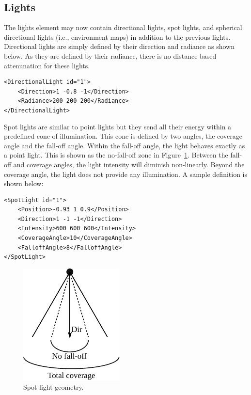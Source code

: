 \documentclass[12pt]{article}
\begin{document}
\subsection{Lights}

The lights element may now contain directional lights, spot lights,
and spherical directional lights (i.e., environment maps) in
addition to the previous lights. Directional lights are simply defined
by their direction and radiance as shown below. As they are defined by
their radiance, there is no distance based attenunation for these
lights.

\begin{verbatim}
<DirectionalLight id="1">
    <Direction>1 -0.8 -1</Direction>
    <Radiance>200 200 200</Radiance>
</DirectionalLight>
\end{verbatim}

Spot lights are similar to point lights but they send all their energy
within a predefined cone of illumination. This cone is defined by two
angles, the coverage angle and the fall-off angle. Within the fall-off
angle, the light behaves exactly as a point light. This is shown as
the no-fall-off zone in Figure~\ref{FigSpot}. Between the
fall-off and coverage angles, the light intensity will diminish
non-linearly. Beyond the coverage angle, the light does not provide
any illumination. A sample definition is shown below:

\begin{verbatim}
<SpotLight id="1">
    <Position>-0.93 1 0.9</Position>
    <Direction>1 -1 -1</Direction>
    <Intensity>600 600 600</Intensity>
    <CoverageAngle>10</CoverageAngle>
    <FalloffAngle>8</FalloffAngle>
</SpotLight>
\end{verbatim}

\begin{figure}
\centerline{
    \includegraphics{img/spotlight.pdf}
}
\caption{Spot light geometry.}
\label{FigSpot}
\end{figure}
\end{document}
